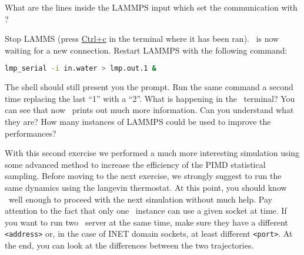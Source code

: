 \documentclass{article}
\begin{document}
\begin{Exercise}[label={inputs},title={Liquid water with the
    \emph{PIGLET} thermostat}]
What are the lines inside the LAMMPS input which set the communication
with \ipi ?

\Question
Stop LAMMS (press \url{Ctrl+c} in the terminal where it has been
ran). \ipi\ is now waiting for a new connection. Restart LAMMPS with
the following command:
\begin{lstlisting}[language=bash]
lmp_serial -i in.water > lmp.out.1 &
\end{lstlisting}
The shell should still present you the prompt. Run the same command a
second time replacing the last ``1'' with a ``2''. What is happening
in the \ipi\ terminal? You can see that now \ipi\ prints out much more
information. Can you understand what they are? How many instances of
LAMMPS could be used to improve the performances?

\end{Exercise}

With this second exercise we performed a much more interesting
simulation using some advanced method to increase the efficiency of
the PIMD statistical sampling. Before moving to the next exercise, we
strongly suggest to run the same dynamics using the langevin
thermostat. At this point, you should know \ipi\ well enough to
proceed with the next simulation without much help. Pay attention to
the fact that only one \ipi\ instance can use a given socket at
time. If you want to run two \ipi\ server at the same time, make sure
they have a different \texttt{<address>} or, in the case of INET domain
sockets, at least different \texttt{<port>}. At the end, you can look
at the differences between the two trajectories.

\vspace{2em}
\end{document}
